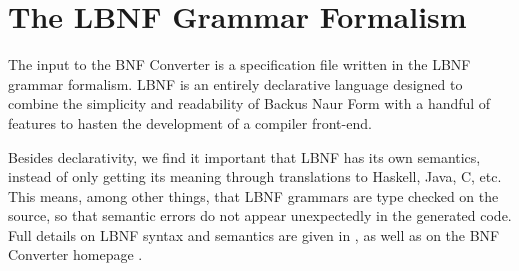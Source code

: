 




\section{The LBNF Grammar Formalism}

\label{lbnf}

The input to the BNF Converter is a specification file written in the 
LBNF grammar formalism. LBNF is an entirely declarative 
language designed to combine the simplicity and readability of 
Backus Naur Form with a handful of features to hasten the development of 
a compiler front-end.

Besides declarativity, we find it important that LBNF has its
own semantics, instead of only getting its meaning through
translations to Haskell, Java, C, etc. This means, among other
things, that LBNF grammars are type checked on the source,
so that semantic errors do not appear unexpectedly in the generated
code. Full details on LBNF syntax and semantics are given in \cite{bnfc},
as well as on the BNF Converter homepage \cite{bnfcsite}.



